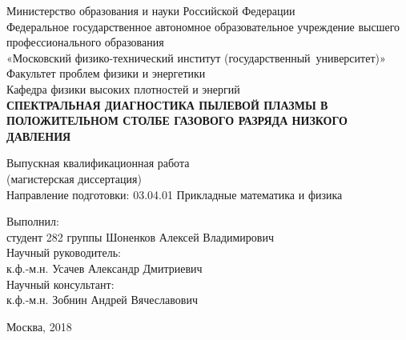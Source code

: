 \begin{center}
    Министерство образования и науки Российской Федерации\\
    Федеральное государственное автономное образовательное учреждение высшего профессионального образования\\
    «Московский физико-технический институт \pt(государственный~университет)»\\[10mm]

    Факультет проблем физики и энергетики\\[5mm]
    Кафедра физики высоких плотностей и энергий\\[15mm]

    \textbf{
        СПЕКТРАЛЬНАЯ ДИАГНОСТИКА ПЫЛЕВОЙ ПЛАЗМЫ В ПОЛОЖИТЕЛЬНОМ СТОЛБЕ ГАЗОВОГО РАЗРЯДА НИЗКОГО ДАВЛЕНИЯ\\[10mm]
    }

    Выпускная квалификационная работа\\
    (магистерская диссертация)\\[5mm]

Направление подготовки: 03.04.01 Прикладные математика и физика\\[15mm]
\end{center}
Выполнил:\\
студент 282 группы \uline{\hfill} Шоненков Алексей Владимирович\\[10mm]
Научный руководитель:\\
к.ф.-м.н. \uline{\hfill} Усачев Александр Дмитриевич\\[10mm]
Научный консультант:\\
к.ф.-м.н.  \uline{\hfill} Зобнин Андрей Вячеславович
\vfill

\begin{center}
    Москва, 2018
\end{center}

\thispagestyle{empty}
